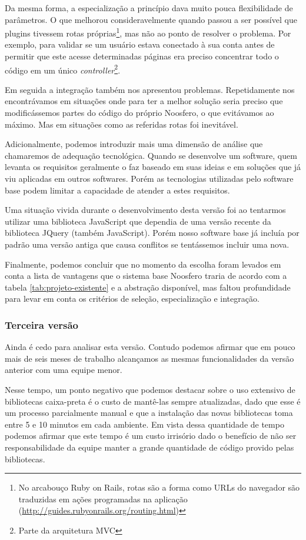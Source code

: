 \documentclass[12pt]{article}
\begin{document}
    Da mesma forma, a especialização a princípio dava muito pouca flexibilidade de parâmetros. O que melhorou consideravelmente quando passou a ser possível que plugins tivessem rotas próprias\footnote{No arcabouço Ruby on Rails, rotas são a forma como URLs do navegador são traduzidas em ações programadas na aplicação (\url{http://guides.rubyonrails.org/routing.html})}, mas não ao ponto de resolver o problema. Por exemplo, para validar se um usuário estava conectado à sua conta antes de permitir que este acesse determinadas páginas era preciso concentrar todo o código em um único \textit{controller}\footnote{Parte da arquitetura MVC}.

    Em seguida a integração também nos apresentou problemas. Repetidamente nos encontrávamos em situações onde para ter a melhor solução seria preciso que modificássemos partes do código do próprio Noosfero, o que evitávamos ao máximo. Mas em situações como as referidas rotas foi inevitável.

    Adicionalmente, podemos introduzir mais uma dimensão de análise que chamaremos de adequação tecnológica. Quando se desenvolve um software, quem levanta os requisitos geralmente o faz baseado em suas ideias e em soluções que já viu aplicadas em outros softwares. Porém as tecnologias utilizadas pelo software base podem limitar a capacidade de atender a estes requisitos.

    Uma situação vivida durante o desenvolvimento desta versão foi ao tentarmos utilizar uma biblioteca JavaScript que dependia de uma versão recente da biblioteca JQuery (também JavaScript). Porém nosso software base já incluía por padrão uma versão antiga que causa conflitos se tentássemos incluir uma nova.

    Finalmente, podemos concluir que no momento da escolha foram levados em conta a lista de vantagens que o sistema base Noosfero traria de acordo com a tabela \ref{tab:projeto-existente} e a abstração disponível, mas faltou profundidade para levar em conta os critérios de seleção, especialização e integração.

    \subsubsection{Terceira versão}
    Ainda é cedo para analisar esta versão. Contudo podemos afirmar que em pouco mais de seis meses de trabalho alcançamos as mesmas funcionalidades da versão anterior com uma equipe menor.

    Nesse tempo, um ponto negativo que podemos destacar sobre o uso extensivo de bibliotecas caixa-preta é o custo de mantê-las sempre atualizadas, dado que esse é um processo parcialmente manual e que a instalação das novas bibliotecas toma entre 5 e 10 minutos em cada ambiente. Em vista dessa quantidade de tempo podemos afirmar que este tempo é um custo irrisório dado o benefício de não ser responsabilidade da equipe manter a grande quantidade de código provido pelas bibliotecas.
\end{document}
